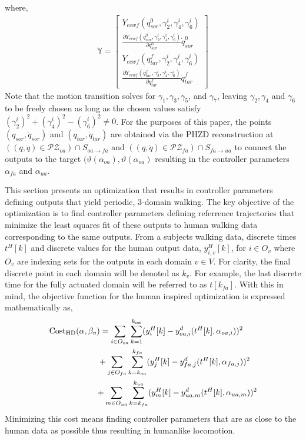 where,
\begin{align}
 \mathbb{Y} = 
 \begin{bmatrix}
  Y_{ecwf}(q^{0}_{sor},\gamma^{i}_{2},\gamma^{i}_{4},\gamma^{i}_{6}) \\
  \frac{\partial Y_{ecwf}(q^{0}_{sor},\gamma^{i}_{2},\gamma^{i}_{4},\gamma^{i}_{6})}{\partial q^{0}_{sor}}\dot{q}^{0}_{sor} \\
  Y_{ecwf}(q^{f}_{tar},\gamma^{i}_{2},\gamma^{i}_{4},\gamma^{i}_{6}) \\
  \frac{\partial Y_{ecwf}(q^{f}_{tar},\gamma^{i}_{2},\gamma^{i}_{4},\gamma^{i}_{6})}{\partial q^{f}_{tar}}\dot{q}^{f}_{tar}
 \end{bmatrix}
\end{align}
Note that the motion transition solves for $\gamma_{1},\gamma_{3},\gamma_{5}$, and $\gamma_{7}$, leaving $\gamma_{2},\gamma_{4}$ and $\gamma_{6}$ to be freely chosen as long as the chosen values satisfy $(\gamma^{i}_{2})^{2}+(\gamma^{i}_{4})^{2}-(\gamma^{i}_{6})^{2} \neq 0$. For the purposes of this paper, the points $(q_{sor},\dot{q}_{sor})$ and $(q_{tar},\dot{q}_{tar})$ are 
obtained via the PHZD reconstruction at $((q,\dot{q}) \in \mathcal{PZ}_{oa}) \cap S_{oa \rightarrow fa}$ and $((q,\dot{q}) \in \mathcal{PZ}_{fa}) \cap S_{fa \rightarrow ua}$ to connect the outputs to the target $(\vartheta(\alpha_{oa}),\dot{\vartheta}(\alpha_{oa})$ resulting in the controller parameters $\alpha_{fa}$ and $\alpha_{ua}$.

This section presents an optimization that results in controller parameters defining outputs that yield periodic, 3-domain walking. The key objective of the optimization is to find controller parameters defining referrence trajectories that minimize the least squares fit of these outputs to human walking data corresponding to the same outputs. From a subjects walking data, discrete times $t^{H}[k]$ and discrete values for the human output data, $y^{H}_{i,v}[k]$, for $i \in O_{v}$ where $O_{v}$ are indexing sets for the outputs in each domain $v \in V$. For clarity, the final discrete point in each domain will be denoted as $k_{v}$. For example, the last discrete time for the fully actuated domain will be referred to as $t[k_{fa}]$. With this in mind, the objective function for the human 
inspired optimization is expressed mathematically as,
\begin{align}
\label{eq:cost}
\hspace{-6mm} \mathrm{Cost_{HD}}(\alpha,\beta_{v}) = 
 \sum\limits_{i \in O_{oa}}\sum\limits_{k = 1}^{k_{oa}}(y^{H}_{i}[k] - y^{d}_{oa,i}(t^{H}[k],\alpha_{oa,i}))^{2} \\ + 
 \sum\limits_{j \in O_{fa}}\sum\limits_{k = k_{oa}}^{k_{fa}}(y^{H}_{j}[k] - y^{d}_{fa,j}(t^{H}[k],\alpha_{fa,j}))^{2} \hspace{-3mm} \nonumber \\ +
 \sum\limits_{m \in O_{ua}}\sum\limits_{k = k_{fa}}^{k_{ua}}(y^{H}_{m}[k] - y^{d}_{ua,m}(t^{H}[k],\alpha_{ua,m}))^{2} \hspace{-6mm} \nonumber 
\end{align}
Minimizing this cost means finding controller parameters that are as close to the human data as possible thus resulting in humanlike locomotion.

